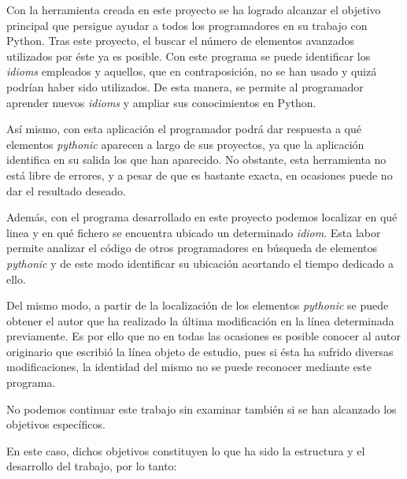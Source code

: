 \documentclass[a4paper, 12pt]{book}
\begin{document}
Con la herramienta creada en este proyecto se ha logrado alcanzar el objetivo principal que persigue ayudar a todos los programadores en su trabajo con Python. Tras este proyecto, el buscar el número de elementos avanzados utilizados por éste ya es posible. Con este programa se puede identificar los \textit{idioms} empleados y aquellos, que en contraposición, no se han usado y quizá podrían haber sido utilizados. De esta manera, se permite al programador aprender nuevos \textit{idioms} y ampliar sus conocimientos en Python.

Así mismo, con esta aplicación el programador podrá dar respuesta a qué elementos \textit{pythonic} aparecen a largo de sus proyectos, ya que la aplicación identifica en su salida los que han aparecido. No obstante, esta herramienta no está libre de errores, y a pesar de que es bastante exacta, en ocasiones puede no dar el resultado deseado.

Además, con el programa desarrollado en este proyecto podemos localizar en qué linea y en qué fichero se encuentra ubicado un determinado \textit{idiom}. Esta labor permite analizar el código de otros programadores en búsqueda de elementos \textit{pythonic} y de este modo identificar su ubicación acortando el tiempo dedicado a ello.

Del mismo modo, a partir de la localización de los elementos \textit{pythonic} se puede obtener el autor que ha realizado la última modificación en la línea determinada previamente. Es por ello que no en todas las ocasiones es posible conocer al autor originario que escribió la línea objeto de estudio, pues si ésta ha sufrido diversas modificaciones, la identidad del mismo no se puede reconocer mediante este programa.

No podemos continuar este trabajo sin examinar también si se han alcanzado los objetivos específicos.

En este caso, dichos objetivos constituyen lo que ha sido la estructura y el desarrollo del trabajo, por lo tanto:
\end{document}
